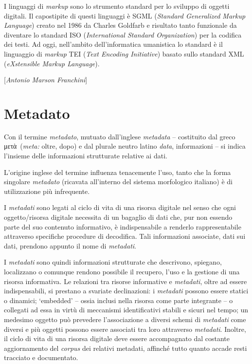 {I linguaggi di \emph{markup} sono lo strumento standard per lo sviluppo
di oggetti digitali. Il capostipite di questi linguaggi è SGML
(\emph{Standard Generalized Markup Language}) creato nel 1986 da Charles
Goldfarb e risultato tanto funzionale da diventare lo standard ISO
(\emph{International Standard Organization}) per la codifica dei testi.
Ad oggi, nell'ambito dell'informatica umanistica lo standard è il
linguaggio di \emph{markup} TEI (\emph{Text Encoding Initiative}) basato
sullo standard XML (\emph{eXstensible Markup Language}).

\hrulefill 

{[}\emph{Antonio Marson Franchini}{]}



\chapter{Metadato}

Con il termine \emph{metadato}, mutuato dall'inglese \emph{metadata} --
costituito dal greco μετὰ~(\emph{meta:} oltre, dopo) e dal plurale
neutro latino \emph{data}, informazioni -- si indica l'insieme delle
informazioni strutturate relative ai dati.

L'origine inglese del termine influenza tenacemente l'uso, tanto che la
forma singolare \emph{metadato} (ricavata all'interno del sistema
morfologico italiano) è di utilizzazione più infrequente.

I \emph{metadati} sono legati al ciclo di vita di una risorsa digitale
nel senso che ogni oggetto/risorsa digitale necessita di un bagaglio di
dati che, pur non essendo parte del suo contenuto informativo, è
indispensabile a renderlo rappresentabile attraverso specifiche
procedure di decodifica. Tali informazioni associate, dati sui dati,
prendono appunto il nome di \emph{metadati}.

I \emph{metadati} sono quindi informazioni strutturate che descrivono,
spiegano, localizzano o comunque rendono possibile il recupero, l'uso e
la gestione di una risorsa informativa. Le relazioni tra risorse
informative e \emph{metadati}, oltre ad essere indispensabili, si
prestano a svariate declinazioni: i \emph{metadati} possono essere
statici o dinamici; `embedded' -- ossia inclusi nella risorsa come parte
integrante -- o collegati ad essa in virtù di meccanismi identificativi
stabili e sicuri nel tempo; un medesimo oggetto può prevedere
l'associazione a diversi schemi di \emph{metadati} come diversi e più
oggetti possono essere associati tra loro attraverso \emph{metadati}.
Inoltre, il ciclo di vita di una risorsa digitale deve essere
accompagnato dal costante aggiornamento del \emph{corpus} dei relativi
metadati, affinché tutto quanto accade resti tracciato e documentato.

}
